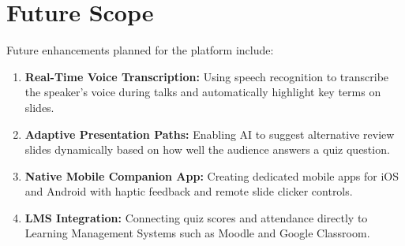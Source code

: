 \section{Future Scope}

Future enhancements planned for the platform include:
\begin{enumerate}
    \item \textbf{Real-Time Voice Transcription:} Using speech recognition to transcribe the speaker's voice during talks and automatically highlight key terms on slides.
    \item \textbf{Adaptive Presentation Paths:} Enabling AI to suggest alternative review slides dynamically based on how well the audience answers a quiz question.
    \item \textbf{Native Mobile Companion App:} Creating dedicated mobile apps for iOS and Android with haptic feedback and remote slide clicker controls.
    \item \textbf{LMS Integration:} Connecting quiz scores and attendance directly to Learning Management Systems such as Moodle and Google Classroom.
\end{enumerate}
